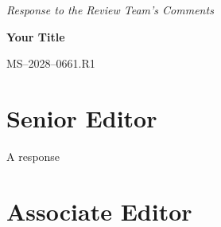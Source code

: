 \documentclass{response}
\begin{document}
\begin{center}
	\large
	\textit{Response to the Review Team's Comments}

	\textbf{Your Title}

	MS--2028--0661.R1
\end{center}

\section{Senior Editor}
\begin{comment}[void]
	A void comment
\end{comment}
\begin{response}
	A response
\end{response}
\begin{comment}
	a regular comment
\end{comment}
\begin{comment}
	second comment
\end{comment}
\section{Associate Editor}
\begin{comment}[void]
	test1	
\end{comment}
\begin{comment}
	second2
\end{comment}
\printbibliography
\end{document}
